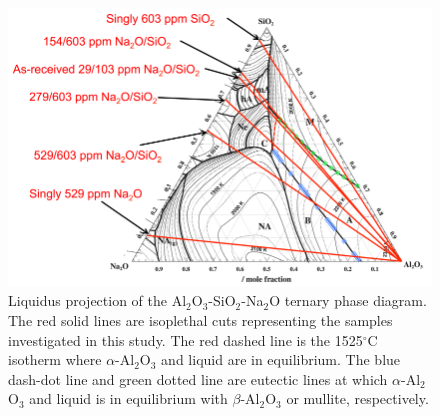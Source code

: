 \newpage
\begin{figure}[H]
	\centering
	\includegraphics[width=\textwidth]{Chapter-3/Figures/Figure9.png}
	\caption{Liquidus projection of the Al$_{2}$O$_{3}$-SiO$_{2}$-Na$_{2}$O ternary phase diagram. The red solid lines are isoplethal cuts representing the samples investigated in this study. The red dashed line is the 1525$^{\circ}$C isotherm where $\alpha$-Al$_{2}$O$_{3}$ and liquid are in equilibrium. The blue dash-dot line and green dotted line are eutectic lines at which $\alpha$-Al$_{2}$O$_{3}$ and liquid is in equilibrium with $\beta$-Al$_{2}$O$_{3}$ or mullite, respectively.}
	\label{Ch3-figure:Figure9}
\end{figure}
